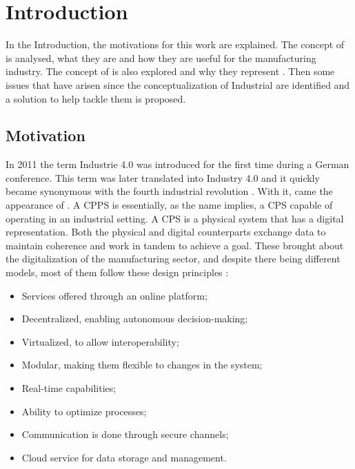 


\chapter{Introduction}
\label{cha:introduction}

In the Introduction, the motivations for this work are explained. The concept of  is analysed, what they are and how they are useful for the manufacturing industry. The concept of  is also explored and why they represent . Then some issues that have arisen since the conceptualization of Industrial  are identified and a solution to help tackle them is proposed.

\section{Motivation}
\label{sec:motivation}

In 2011 the term Industrie 4.0 was introduced for the first time during a German conference. This term was later translated into Industry 4.0 and it quickly became synonymous with the fourth industrial revolution \cite{birgit01}. With it, came the appearance of . A \acrshort{CPPS} is essentially, as the name implies, a \acrfull{CPS} capable of operating in an industrial setting. A \acrshort{CPS} is a physical system that has a digital representation. Both the physical and digital counterparts exchange data to maintain coherence and work in tandem to achieve a goal. These  brought about the digitalization of the manufacturing sector, and despite there being different models, most of them follow these design principles \cite{birgit01}:

\begin{itemize}
	\item Services offered through an online platform;
	\item Decentralized, enabling autonomous decision-making;
	\item Virtualized, to allow interoperability;
	\item Modular, making them flexible to changes in the system;
	\item Real-time capabilities;
	\item Ability to optimize processes;
	\item Communication is done through secure channels;
	\item Cloud service for data storage and management.
\end{itemize}


